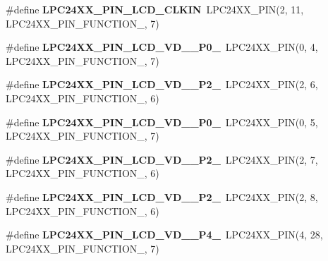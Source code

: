 \begin{DoxyCompactItemize}
\#define {\bfseries L\+P\+C24\+X\+X\+\_\+\+P\+I\+N\+\_\+\+L\+C\+D\+\_\+\+C\+L\+K\+IN}~L\+P\+C24\+X\+X\+\_\+\+P\+IN(2, 11, L\+P\+C24\+X\+X\+\_\+\+P\+I\+N\+\_\+\+F\+U\+N\+C\+T\+I\+O\+N\+\_, 7)
\item 
\mbox{\label{group__lpc24xx__io_ga4dfda2d62021d7dd1bafae357255891b}} 
\#define {\bfseries L\+P\+C24\+X\+X\+\_\+\+P\+I\+N\+\_\+\+L\+C\+D\+\_\+\+V\+D\+\_\+\_\+\+P0\+\_}~L\+P\+C24\+X\+X\+\_\+\+P\+IN(0, 4, L\+P\+C24\+X\+X\+\_\+\+P\+I\+N\+\_\+\+F\+U\+N\+C\+T\+I\+O\+N\+\_, 7)
\item 
\mbox{\label{group__lpc24xx__io_ga9606adf0fe7ebf46ce183991ffa3b528}} 
\#define {\bfseries L\+P\+C24\+X\+X\+\_\+\+P\+I\+N\+\_\+\+L\+C\+D\+\_\+\+V\+D\+\_\+\_\+\+P2\+\_}~L\+P\+C24\+X\+X\+\_\+\+P\+IN(2, 6, L\+P\+C24\+X\+X\+\_\+\+P\+I\+N\+\_\+\+F\+U\+N\+C\+T\+I\+O\+N\+\_, 6)
\item 
\mbox{\label{group__lpc24xx__io_ga7413637a9a38a22260c914f8320f4f6f}} 
\#define {\bfseries L\+P\+C24\+X\+X\+\_\+\+P\+I\+N\+\_\+\+L\+C\+D\+\_\+\+V\+D\+\_\+\_\+\+P0\+\_}~L\+P\+C24\+X\+X\+\_\+\+P\+IN(0, 5, L\+P\+C24\+X\+X\+\_\+\+P\+I\+N\+\_\+\+F\+U\+N\+C\+T\+I\+O\+N\+\_, 7)
\item 
\mbox{\label{group__lpc24xx__io_ga4a25afa1520f7bdc1111c0b93abb4746}} 
\#define {\bfseries L\+P\+C24\+X\+X\+\_\+\+P\+I\+N\+\_\+\+L\+C\+D\+\_\+\+V\+D\+\_\+\_\+\+P2\+\_}~L\+P\+C24\+X\+X\+\_\+\+P\+IN(2, 7, L\+P\+C24\+X\+X\+\_\+\+P\+I\+N\+\_\+\+F\+U\+N\+C\+T\+I\+O\+N\+\_, 6)
\item 
\mbox{\label{group__lpc24xx__io_ga1876118b513d6f81988c53f0966fa8a0}} 
\#define {\bfseries L\+P\+C24\+X\+X\+\_\+\+P\+I\+N\+\_\+\+L\+C\+D\+\_\+\+V\+D\+\_\+\_\+\+P2\+\_}~L\+P\+C24\+X\+X\+\_\+\+P\+IN(2, 8, L\+P\+C24\+X\+X\+\_\+\+P\+I\+N\+\_\+\+F\+U\+N\+C\+T\+I\+O\+N\+\_, 6)
\item 
\mbox{\label{group__lpc24xx__io_gaf45a22ec0f70b5c40eaa0d509e87e16f}} 
\#define {\bfseries L\+P\+C24\+X\+X\+\_\+\+P\+I\+N\+\_\+\+L\+C\+D\+\_\+\+V\+D\+\_\+\_\+\+P4\+\_}~L\+P\+C24\+X\+X\+\_\+\+P\+IN(4, 28, L\+P\+C24\+X\+X\+\_\+\+P\+I\+N\+\_\+\+F\+U\+N\+C\+T\+I\+O\+N\+\_, 7)
\item 

\end{DoxyCompactItemize}
